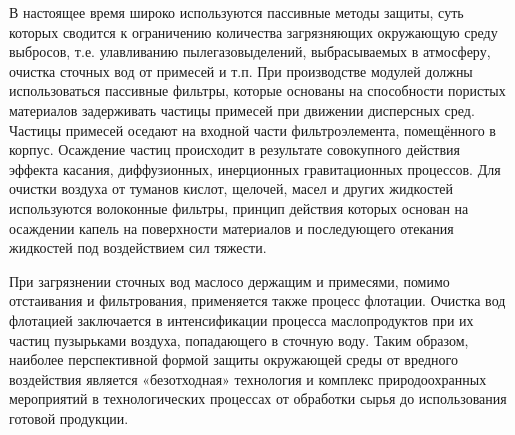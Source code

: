 В настоящее время широко используются пассивные методы защиты, суть которых сводится к ограничению количества
загрязняющих окружающую среду выбросов, т.е. улавливанию пылегазовыделений, выбрасываемых в атмосферу, очистка
сточных вод от примесей и т.п. При производстве модулей должны использоваться пассивные фильтры, которые основаны
на способности пористых материалов задерживать частицы примесей при движении дисперсных сред. Частицы примесей оседают
на входной части фильтроэлемента, помещённого в корпус. Осаждение частиц происходит в результате совокупного действия
эффекта касания, диффузионных, инерционных гравитационных процессов. Для очистки воздуха от туманов кислот, щелочей,
масел и других жидкостей используются волоконные фильтры, принцип действия которых основан на осаждении капель на
поверхности материалов и последующего отекания жидкостей под воздействием сил тяжести.

При загрязнении сточных вод маслосо держащим и примесями, помимо отстаивания и фильтрования, применяется также
процесс флотации. Очистка вод флотацией заключается в интенсификации процесса маслопродуктов при их частиц
пузырьками воздуха, попадающего в сточную воду. Таким образом, наиболее перспективной формой защиты окружающей
среды от вредного воздействия является «безотходная» технология и комплекс природоохранных мероприятий в
технологических процессах от обработки сырья до использования готовой продукции.

\newpage
